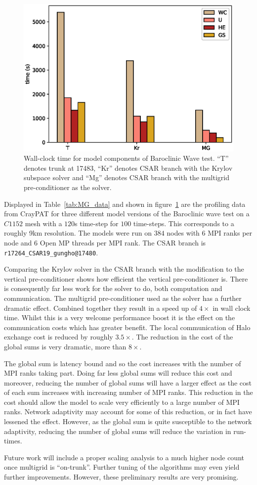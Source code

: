 \begin{figure}[ht!]
\centering\includegraphics[width=1.0\linewidth]{figs/mg-improvement.eps}
\caption{\label{fig:mg}Wall-clock time for model components of
  Baroclinic Wave test. ``T'' denotes trunk at 17483, ``Kr'' denotes
  CSAR branch with the Krylov subspace solver and ``Mg'' denotes
  CSAR branch with the multigrid pre-conditioner as the solver.}
\end{figure} 

Displayed in Table~\ref{tab:MG_data} and shown in figure~\ref{fig:mg}
are the profiling data from CrayPAT for three different model versions
of the Baroclinic wave test on a $C1152$ mesh with a $120$s time-step
for $100$ time-steps. This corresponds to a roughly 9km
resolution. The models were run on $384$ nodes with $6$ MPI ranks per
node and $6$ Open MP threads per MPI rank.  The CSAR branch is
\verb+r17264_CSAR19_gungho@17480+.

Comparing the Krylov solver in the CSAR branch with the modification
to the vertical pre-conditioner shows how efficient the vertical
pre-conditioner is. There is consequently far less work for the solver
to do, both computation and communication. The multigrid
pre-conditioner used as the solver has a further dramatic
effect. Combined together they result in a speed up of $4 \times $ in
wall clock time. Whilst this is a very welcome performance boost it is
the effect on the communication costs which has greater benefit. The
local communication of Halo exchange cost is reduced by roughly
$3.5 \times $. The reduction in the cost of the global sums is very
dramatic, more than $8 \times$. 

The global sum is latency bound and so the cost increases with the
number of MPI ranks taking part. Doing far less global sums will
reduce this cost and moreover, reducing the number of global sums will
have a larger effect as the cost of each sum increases with increasing
number of MPI ranks. This reduction in the cost should
allow the model to scale very efficiently to a large number of MPI
ranks. Network adaptivity may account for some of this reduction, or
in fact have lessened the effect. However, as the global sum is quite
susceptible to the network adaptivity, reducing the number of global
sums will reduce the variation in run-times.

Future work will include a proper scaling analysis to a much higher
node count once multigrid is ``on-trunk''. Further tuning of the
algorithms may even yield further improvements. However, these
preliminary results are very promising.
 
